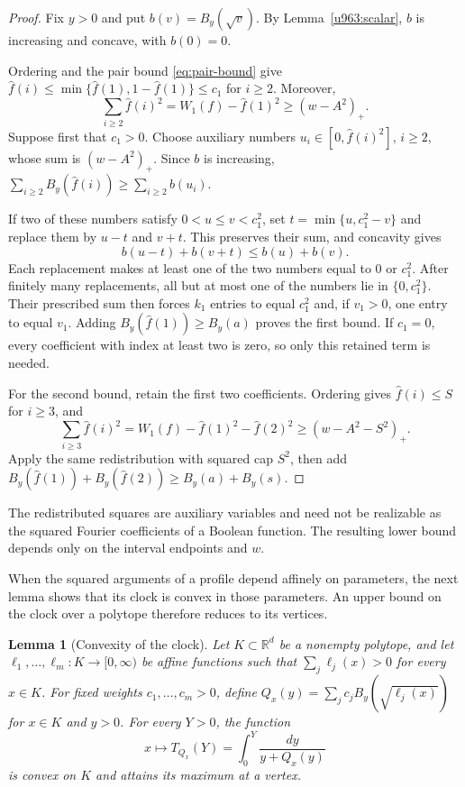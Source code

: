 \documentclass[11pt,letterpaper]{amsart}
\newcommand{\R}{\mathbb R}
\newcommand{\1}{\mathbf 1}
\newtheorem{lemma}[theorem]{Lemma}
\numberwithin{equation}{section}
\begin{document}
\begin{proof}
Fix $y>0$ and put $b(v)=B_y(\sqrt v)$.
By Lemma~\ref{u963:scalar}, $b$ is increasing and concave,
with $b(0)=0$.

Ordering and the pair bound \eqref{eq:pair-bound} give
$\widehat f(i)\le\min\{\widehat f(1),1-\widehat f(1)\}
\le c_1$ for $i\ge2$.
Moreover,
\[
 \sum_{i\ge2}\widehat f(i)^2
 =W_1(f)-\widehat f(1)^2
 \ge(w-A^2)_+.
\]
Suppose first that $c_1>0$.
Choose auxiliary numbers $u_i\in[0,\widehat f(i)^2]$,
$i\ge2$, whose sum is $(w-A^2)_+$.
Since $b$ is increasing,
$\sum_{i\ge2}B_y(\widehat f(i))\ge\sum_{i\ge2}b(u_i)$.

If two of these numbers satisfy $0<u\le v<c_1^2$, set
$t=\min\{u,c_1^2-v\}$ and replace them by $u-t$ and $v+t$.
This preserves their sum, and concavity gives
\[
 b(u-t)+b(v+t)\le b(u)+b(v).
\]
Each replacement makes at least one of the two numbers equal
to $0$ or $c_1^2$.
After finitely many replacements, all but at most one of the
numbers lie in $\{0,c_1^2\}$.
Their prescribed sum then forces $k_1$ entries to equal $c_1^2$
and, if $v_1>0$, one entry to equal $v_1$.
Adding $B_y(\widehat f(1))\ge B_y(a)$ proves the first bound.
If $c_1=0$, every coefficient with index at least two is zero,
so only this retained term is needed.

For the second bound, retain the first two coefficients.
Ordering gives $\widehat f(i)\le S$ for $i\ge3$, and
\[
 \sum_{i\ge3}\widehat f(i)^2
 =W_1(f)-\widehat f(1)^2-\widehat f(2)^2
 \ge(w-A^2-S^2)_+.
\]
Apply the same redistribution with squared cap $S^2$,
then add
$B_y(\widehat f(1))+B_y(\widehat f(2))
\ge B_y(a)+B_y(s)$.
\end{proof}

The redistributed squares are auxiliary variables and need not
be realizable as the squared Fourier coefficients of a Boolean
function. The resulting lower bound depends only on the interval
endpoints and $w$.

When the squared arguments of a profile depend affinely on
parameters, the next lemma shows that its clock is convex in
those parameters. An upper bound on the clock over a polytope
therefore reduces to its vertices.

\begin{lemma}[Convexity of the clock]\label{lem:source-convexity}
Let $K\subset\R^d$ be a nonempty polytope, and let
$\ell_1,\ldots,\ell_m:K\to[0,\infty)$ be affine functions
such that $\sum_j\ell_j(x)>0$ for every $x\in K$.
For fixed weights $c_1,\ldots,c_m>0$, define
$Q_x(y)=\sum_jc_jB_y(\sqrt{\ell_j(x)})$ for $x\in K$ and $y>0$.
For every $Y>0$, the function
\[
 x\longmapsto T_{Q_x}(Y)
 =\int_0^Y\frac{dy}{y+Q_x(y)}
\]
is convex on $K$ and attains its maximum at a vertex.
\end{lemma}
\end{document}
